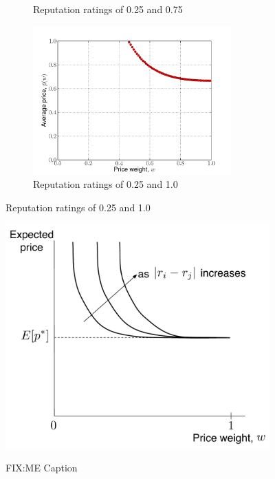 \begin{figure}[htp]
\begin{subfigure}[b]{0.5\textwidth}
	  \caption{Reputation ratings of 0.25 and 0.75}
	  \label{fig:expected_prices_025_075}
	\end{subfigure}
	\begin{subfigure}[b]{0.5\textwidth}
	  \includegraphics[width=3in]{2/Figures/expected_prices_025_1}
	  \caption{Reputation ratings of 0.25 and 1.0}
	  \label{fig:expected_prices_025_1}
	\end{subfigure}
\end{figure}
\begin{figure}[t]
  \caption{FIX:ME Caption}
  \includegraphics[width=4in]{2/Figures/expected_prices_relation}
  \label{fig:expected_prices_relation}
\end{figure}


